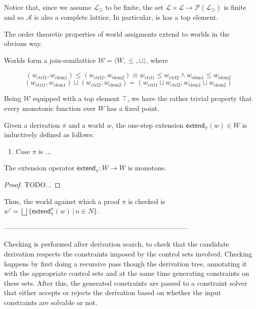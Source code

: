Notice that, since we assume $\mathcal{L}_{\odot}$ to be finite, the set
$\mathcal{L} \times \mathcal{L} \to \mathcal{P}(\mathcal{L}_\odot)$ is finite
and so $\mathcal{A}$ is also a complete lattice. In particular, is has a top
element.

The order theoretic properties of world assigments extend to worlds in the
obvious way.

\begin{definition}
  Worlds form a join-semilattice
  $\mathcal{W} = \langle W, \leq, \sqcup \rangle$, where

  \[
    (w_{\text{ctrl}1}, w_{\text{elem}1}) \leq
    (w_{\text{ctrl}2}, w_{\text{elem}2}) \equiv
    w_{\text{ctrl}1} \leq w_{\text{ctrl}2} \wedge
    w_{\text{elem}1} \leq w_{\text{elem}2}
  \]
  \[
    (w_{\text{ctrl}1}, w_{\text{elem}1}) \sqcup
    (w_{\text{ctrl}2}, w_{\text{elem}2}) =
    (w_{\text{ctrl}1} \sqcup w_{\text{ctrl}2}, w_{\text{elem}1} \sqcup w_{\text{elem}2})
  \]
\end{definition}

Being $\mathcal{W}$ equipped with a top element $\top$, we have the rather
trivial property that every monotonic function over $W$ has a fixed point.

Given a derivation $\pi$ and a world $w$, the one-step extension
$\textsf{extend}_{\pi}(w) \in W$ is inductively defined as follows:

\begin{enumerate}
\item Case $\pi$ is ...
\end{enumerate}

\begin{proposition}
  The extension operator $\textsf{extend}_{\pi} : W \rightarrow W$ is monotone.
\end{proposition}
\begin{proof}
  TODO...
\end{proof}

Thus, the world against which a proof $\pi$ is checked is
$w' = \bigsqcup \{ \textsf{extend}_{\pi}^n(w) \, | \, n \in N \}$.

--------------------------------------------------------------------------------




Checking is performed after derivation search, to check that the candidate
derivation respects the constraints imposed by the control sets involved.
Checking happens by first doing a recursive pass though the derivation tree,
annotating it with the appropriate control sets and at the same time generating
constraints on these sets. After this, the generated constraints are passed to a
constraint solver that either accepts or rejects the derivation based on whether
the input constraints are solvable or not.

